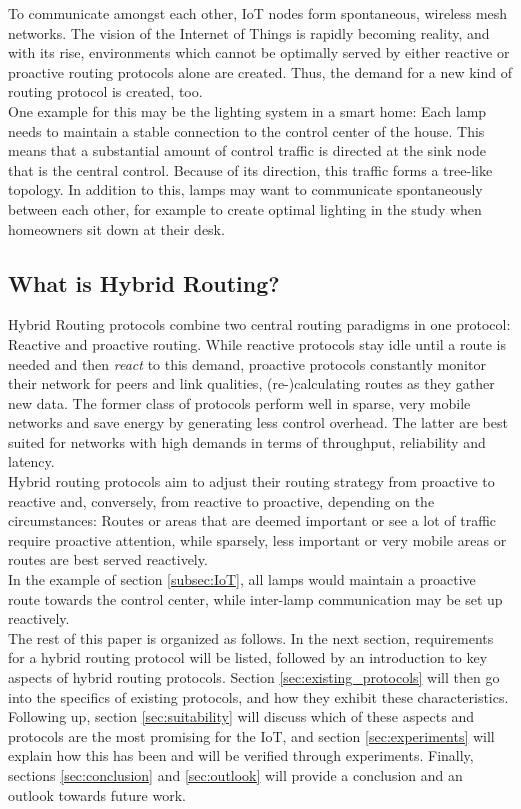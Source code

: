 \documentclass[a4paper,10pt]{scrartcl}
\begin{document}
To communicate amongst each other, IoT nodes form spontaneous, wireless mesh networks.
The vision of the Internet of Things is rapidly becoming reality, and with its rise, environments which cannot be optimally served by either reactive or proactive routing protocols alone are created. Thus, the demand for a new kind of routing protocol is created, too.\\
One example for this may be the lighting system in a smart home: Each lamp needs to maintain a stable connection to the control center of the house. This means that a substantial amount of control traffic is directed at the sink node that is the central control. Because of its direction, this traffic forms a tree-like topology. In addition to this, lamps may want to communicate spontaneously between each other, for example to create optimal lighting in the study when homeowners sit down at their desk.

\subsection{What is Hybrid Routing?}
\label{subsec:hybrid}
Hybrid Routing protocols combine two central routing paradigms in one protocol: Reactive and proactive routing. While reactive protocols stay idle until a route is needed and then \emph{react} to this demand, proactive protocols constantly monitor their network for peers and link qualities, (re-)calculating routes as they gather new data. The former class of protocols perform well in sparse, very mobile networks and save energy by generating less control overhead. The latter are best suited for networks with high demands in terms of throughput, reliability and latency.\\
Hybrid routing protocols aim to adjust their routing strategy from proactive to reactive and, conversely, from reactive to proactive, depending on the circumstances: Routes or areas that are deemed important or see a lot of traffic require proactive attention, while sparsely, less important or very mobile areas or routes are best served reactively.\\
In the example of section \ref{subsec:IoT}, all lamps would maintain a proactive route towards the control center, while inter-lamp communication may be set up reactively.\\

The rest of this paper is organized as follows. 
In the next section, requirements for a hybrid routing protocol will be listed, followed by an introduction to key aspects of hybrid routing protocols. Section \ref{sec:existing_protocols} will then go into the specifics of existing protocols, and how they exhibit these characteristics. Following up, section \ref{sec:suitability} will discuss which of these aspects and protocols are the most promising for the IoT, and section \ref{sec:experiments} will explain how this has been and will be verified through experiments. Finally, sections \ref{sec:conclusion} and \ref{sec:outlook} will provide a conclusion and an outlook towards future work.
\end{document}
